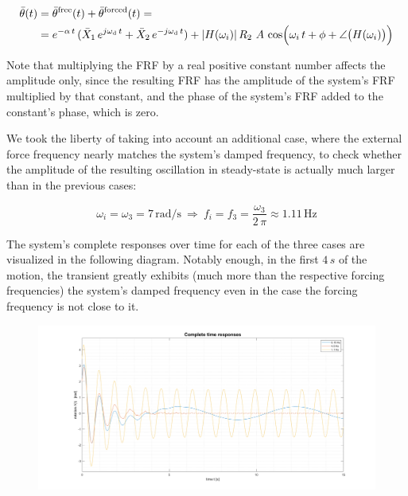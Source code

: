 \documentclass[a4paper,12pt,oneside]{article}
\begin{document}
\[ \begin{split}
	\bar{\theta}(t) & =
		\bar{\theta}^\textup{free}(t) + \bar{\theta}^\textup{forced}(t) = \\
									& = e^{-\alpha \, t} \,
										(\bar{X}_1 \, e^{j \omega_\textup{d} \, t} +
										\bar{X}_2 \, e^{- j \omega_\textup{d} \, t}) +
										|H(\omega_i)| \, R_2 \, \, A \,
										\cos\Bigl(\omega_i \, t + \phi +
										\angle\bigl(H(\omega_i)\bigr)\Bigr)
\end{split} \]

Note that multiplying the FRF by a real positive constant number affects the amplitude only, since the resulting FRF has the amplitude of the system's FRF multiplied by that constant, and the phase of the system's FRF added to the constant's phase, which is zero.

We took the liberty of taking into account an additional case, where the external force frequency nearly matches the system's damped frequency, to check whether the amplitude of the resulting oscillation in steady-state is actually much larger than in the previous cases:

\[
	\omega_i = \omega_3 = 7 \, \text{rad/s} ~ \Rightarrow ~
		f_i = f_3 = \frac{\omega_3}{2 \, \pi} \approx 1.11 \, \text{Hz}
\]

The system's complete responses over time for each of the three cases are visualized in the following diagram. Notably enough, in the first $ 4 \, s $ of the motion, the transient greatly exhibits (much more than the respective forcing frequencies) the system's damped frequency even in the case the forcing frequency is not close to it.

\begin{figure}[h]
	\hspace{-70pt}
	\includegraphics[scale=0.4]{complete_time_responses}
\end{figure}
\end{document}
